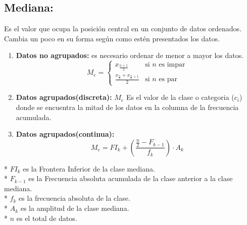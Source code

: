 \documentclass{templateNote}
\begin{document}
\subsection{Mediana:}
Es el valor que ocupa la posición central en un conjunto de datos ordenados. Cambia un
poco en su forma según como estén presentados los datos.
\begin{enumerate}
    \item \textbf{Datos no agrupados:} es necesario ordenar de menor a mayor los datos.
    \begin{equation*}
        M_e = \displaystyle \left\{ \begin{array}{ll}
            x_{\frac{n+1}{2}} & \textrm{si $n$ es impar}\\
            \frac{\displaystyle x_{\frac{n}{2}} + x_{\frac{n}{2}+1}}{2} & \textrm{si $n$ es par}
        \end{array} \right.
    \end{equation*}
    \item \textbf{Datos agrupados(discreta):}
    $M_e$ Es el valor de la clase o categoria ($c_i$) donde se encuentra la mitad de los datos en la columna de la frecuencia acumulada.
    \newpage
    \item \textbf{Datos agrupados(continua):}
    \begin{equation*}
        M_e = FI_k + \left(\frac{\displaystyle \frac{n}{2} - F_{k-1}}{f_k}\right) \cdot A_k
    \end{equation*}
\end{enumerate}
* $FI_k$ es la Frontera Inferior de la clase mediana.\\
* $F_{k-1}$ es la Frecuencia absoluta acumulada de la clase anterior a la clase mediana.\\
* $f_k$ es la frecuencia absoluta de la clase.\\
* $A_k$ es la amplitud de la clase mediana.\\
* $n$ es el total de datos.\\
\end{document}
